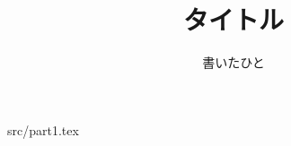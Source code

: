 \documentclass[11pt,a4paper]{jsarticle}
\title {タイトル}
\author {書いたひと}
\begin{document}
\maketitle
 {src/part1.tex}
\end{document}
